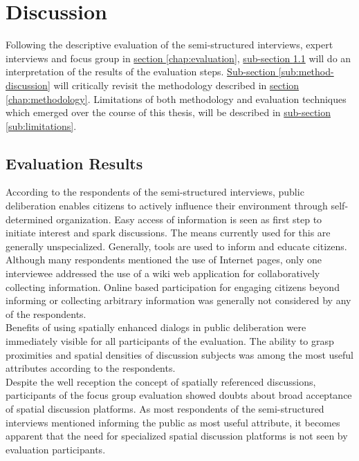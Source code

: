 \section{Discussion}
\label{chap:discussion}
Following the descriptive evaluation of the semi-structured interviews, expert interviews and focus group in \hyperref[chap:evaluation]{section \ref{chap:evaluation}}, \hyperref[sub:evaluation-results]{sub-section \ref{sub:evaluation-results}} will do an interpretation of the results of the evaluation steps. \hyperref[sub:method-discussion]{Sub-section \ref{sub:method-discussion}} will critically revisit the methodology described in \hyperref[chap:methodology]{section \ref{chap:methodology}}. Limitations of both methodology and evaluation techniques which emerged over the course of this thesis, will be described in \hyperref[sub:limitations]{sub-section \ref{sub:limitations}}.

\subsection{Evaluation Results}
\label{sub:evaluation-results}
According to the respondents of the semi-structured interviews, public deliberation enables citizens to actively influence their environment through self-determined organization. Easy access of information is seen as first step to initiate interest and spark discussions. The means currently used for this are generally unspecialized. Generally, tools are used to inform and educate citizens. Although many respondents mentioned the use of Internet pages, only one interviewee addressed the use of a wiki web application for collaboratively collecting information. Online based participation for engaging citizens beyond informing or collecting arbitrary information was generally not considered by any of the respondents.\\
Benefits of using spatially enhanced dialogs in public deliberation were immediately visible for all participants of the evaluation. The ability to grasp proximities and spatial densities of discussion subjects was among the most useful attributes according to the respondents. \\
Despite the well reception the concept of spatially referenced discussions, participants of the focus group evaluation showed doubts about broad acceptance of spatial discussion platforms. As most respondents of the semi-structured interviews mentioned informing the public as most useful attribute, it becomes apparent that the need for specialized spatial discussion platforms is not seen by evaluation participants.

